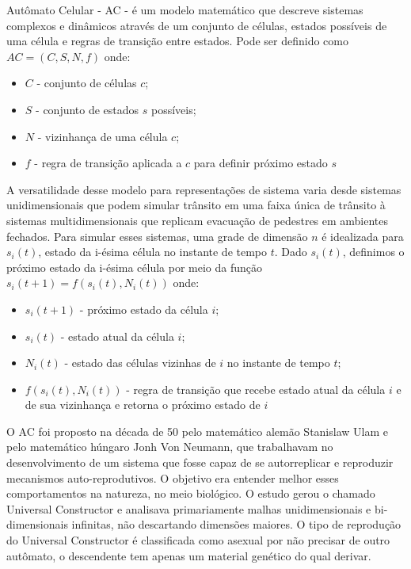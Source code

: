 Autômato Celular - AC - é um modelo matemático que descreve sistemas complexos e dinâmicos através de um conjunto de células, estados possíveis de uma célula e regras de transição entre estados. Pode ser definido como $AC = (C, S, N, f)$ onde:
\begin{itemize}
    \item $C$ - conjunto de células $c$;
    \item $S$ - conjunto de estados $s$ possíveis;
    \item $N$ - vizinhança de uma célula $c$;
    \item $f$ - regra de transição aplicada a $c$ para definir próximo estado $s$
\end{itemize}
A versatilidade desse modelo para representações de sistema varia desde sistemas unidimensionais que podem simular trânsito em uma faixa única de trânsito à sistemas multidimensionais que replicam evacuação de pedestres em ambientes fechados.
Para simular esses sistemas, uma grade de dimensão $n$ é idealizada para $s_{i}(t)$, estado da i-ésima célula no instante de tempo $t$. Dado $s_{i}(t)$, definimos o próximo estado da i-ésima célula por meio da função $s_{i}(t+1) = f(s_{i}(t), N_{i}(t))$ onde:
\begin{itemize}
    \item $s_{i}(t+1)$ - próximo estado da célula $i$;
    \item $s_{i}(t)$ - estado atual da célula $i$;
    \item $N_{i}(t)$ - estado das células vizinhas de $i$ no instante de tempo $t$;
    \item $f(s_{i}(t), N_{i}(t))$ - regra de transição que recebe estado atual da célula $i$ e de sua vizinhança e retorna o próximo estado de $i$
\end{itemize}

O AC foi proposto na década de 50 pelo matemático alemão Stanislaw Ulam e pelo matemático húngaro Jonh Von Neumann, que trabalhavam no desenvolvimento de um sistema que fosse capaz de se autorreplicar e reproduzir mecanismos auto-reprodutivos. O objetivo era entender melhor esses comportamentos na natureza, no meio biológico. O estudo gerou o chamado Universal Constructor e analisava primariamente malhas unidimensionais e bi-dimensionais infinitas, não descartando dimensões maiores. O tipo de reprodução do Universal Constructor é classificada como asexual por não precisar de outro autômato, o descendente tem apenas um material genético do qual derivar.

